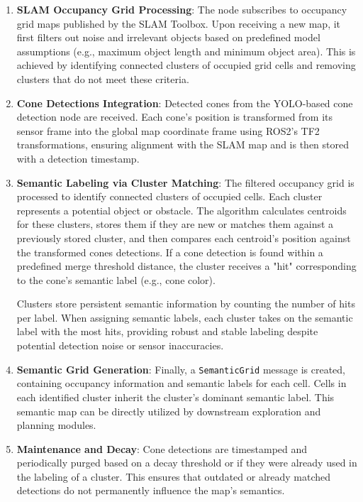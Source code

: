 \begin{enumerate}
    \item \textbf{SLAM Occupancy Grid Processing}:  
    The node subscribes to occupancy grid maps published by the SLAM Toolbox. Upon receiving a new map, it first filters out noise and irrelevant objects based on predefined model assumptions (e.g., maximum object length and minimum object area). This is achieved by identifying connected clusters of occupied grid cells and removing clusters that do not meet these criteria.

    \item \textbf{Cone Detections Integration}:  
    Detected cones from the YOLO-based cone detection node are received. Each cone’s position is transformed from its sensor frame into the global map coordinate frame using ROS2's TF2 transformations, ensuring alignment with the SLAM map and is then stored with a detection timestamp.

    \item \textbf{Semantic Labeling via Cluster Matching}:  
    The filtered occupancy grid is processed to identify connected clusters of occupied cells. Each cluster represents a potential object or obstacle. The algorithm calculates centroids for these clusters, stores them if they are new or matches them against a previously stored cluster, and then compares each centroid’s position against the transformed cones detections. If a cone detection is found within a predefined merge threshold distance, the cluster receives a "hit" corresponding to the cone's semantic label (e.g., cone color).

    Clusters store persistent semantic information by counting the number of hits per label. When assigning semantic labels, each cluster takes on the semantic label with the most hits, providing robust and stable labeling despite potential detection noise or sensor inaccuracies.

    \item \textbf{Semantic Grid Generation}:  
    Finally, a \texttt{SemanticGrid} message is created, containing occupancy information and semantic labels for each cell. Cells in each identified cluster inherit the cluster's dominant semantic label. This semantic map can be directly utilized by downstream exploration and planning modules.

    \item \textbf{Maintenance and Decay}:  
    Cone detections are timestamped and periodically purged based on a decay threshold or if they were already used in the labeling of a cluster. This ensures that outdated or already matched detections do not permanently influence the map’s semantics.

\end{enumerate}

